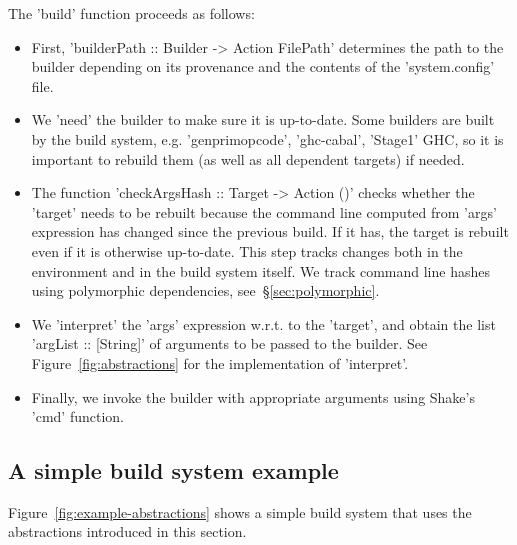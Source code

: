 \noindent The \lst'build' function proceeds as follows:
\begin{itemize}
  \item First, \lst'builderPath :: Builder -> Action FilePath' determines the
  path to the builder depending on its provenance and the contents of the
  \lst'system.config' file.
  \item We \lst'need' the builder to make sure it is up-to-date. Some builders
  are built by the build system, e.g. \lst'genprimopcode',
  \lst'ghc-cabal', \lst'Stage1' GHC, so it is important to rebuild them (as well
  as all dependent targets) if needed.
  \item The function \lst'checkArgsHash :: Target -> Action ()' checks whether the
  \lst'target' needs to be rebuilt because the command line computed from
  \lst'args' expression has changed since the previous build. If it has,
  the target is rebuilt even if it is otherwise up-to-date. This step tracks changes both in
  the environment and in the build system itself. We
  track command line hashes using polymorphic dependencies, see~\S\ref{sec:polymorphic}.
  \item We \lst'interpret' the \lst'args' expression w.r.t. to the
  \lst'target', and obtain the list \lst'argList :: [String]' of arguments to be
  passed to the builder. See Figure~\ref{fig:abstractions} for the implementation of
  \lst'interpret'.
  \item Finally, we invoke the builder with appropriate arguments using Shake's
  \lst'cmd' function.
\end{itemize}

\subsection{A simple build system example\label{sec:build-example}}

Figure~\ref{fig:example-abstractions} shows a simple build system that uses the
abstractions introduced in this section.

\newcommand{\tabx}[1]{\hspace{.106\textwidth}\rlap{#1}}
\newcommand{\taby}[1]{\hspace{.074\textwidth}\rlap{#1}}
\newcommand{\tabz}[1]{\hspace{.24\textwidth}\rlap{#1}}

